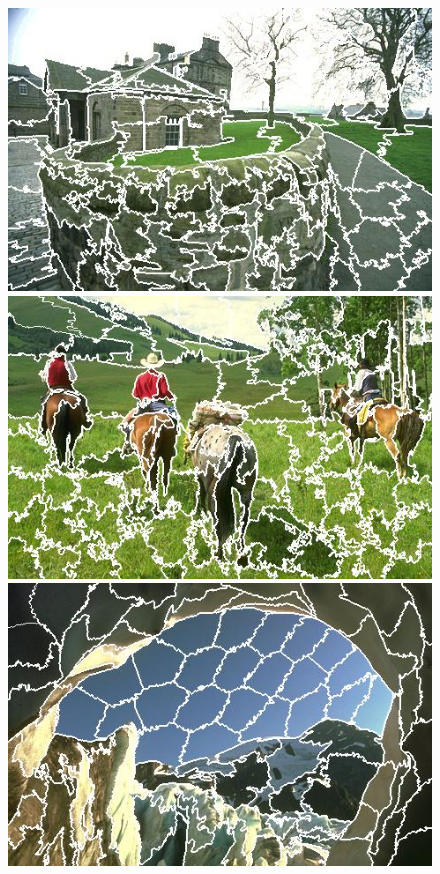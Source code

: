 \begin{figure}[h]
{\begin{minipage}[b]{0.13\linewidth}
\includegraphics[width=1\linewidth]{figures/img/FLIC/FLIC_92014.jpg}
\includegraphics[width=1\linewidth]{figures/img/FLIC/FLIC_220003.jpg}
\includegraphics[width=1\linewidth]{figures/img/FLIC/FLIC_176051.jpg}

\end{minipage}}
\end{figure}
